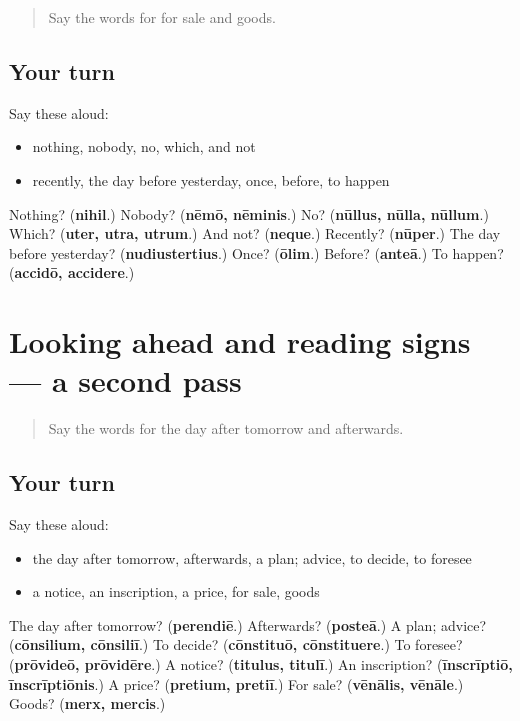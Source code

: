 \begin{quote}
Say the words for for sale and goods.
\end{quote}

\subsection*{Your turn}
Say these aloud:

\begin{itemize}
\raggedright
  \item nothing, nobody, no, which, and not
  \item recently, the day before yesterday, once, before, to happen
\end{itemize}

\begin{tcolorbox}[breakable,colback=teal!4,colframe=teal!35!black,title={Before you move on}]
Nothing? (\textbf{nihil}.) Nobody? (\textbf{nēmō, nēminis}.) No? (\textbf{nūllus, nūlla, nūllum}.) Which? (\textbf{uter, utra, utrum}.) And not? (\textbf{neque}.) Recently? (\textbf{nūper}.) The day before yesterday? (\textbf{nudiustertius}.) Once? (\textbf{ōlim}.) Before? (\textbf{anteā}.) To happen? (\textbf{accidō, accidere}.)
\end{tcolorbox}
\section[(dialogue)]{Looking ahead and reading signs — a second pass}

\label{lesson:LA-R164-second-pass-looking-ahead-and-reading-signs}



\begin{quote}
Say the words for the day after tomorrow and afterwards.
\end{quote}

\subsection*{Your turn}
Say these aloud:

\begin{itemize}
\raggedright
  \item the day after tomorrow, afterwards, a plan; advice, to decide, to foresee
  \item a notice, an inscription, a price, for sale, goods
\end{itemize}

\begin{tcolorbox}[breakable,colback=teal!4,colframe=teal!35!black,title={Before you move on}]
The day after tomorrow? (\textbf{perendiē}.) Afterwards? (\textbf{posteā}.) A plan; advice? (\textbf{cōnsilium, cōnsiliī}.) To decide? (\textbf{cōnstituō, cōnstituere}.) To foresee? (\textbf{prōvideō, prōvidēre}.) A notice? (\textbf{titulus, titulī}.) An inscription? (\textbf{īnscrīptiō, īnscrīptiōnis}.) A price? (\textbf{pretium, pretiī}.) For sale? (\textbf{vēnālis, vēnāle}.) Goods? (\textbf{merx, mercis}.)
\end{tcolorbox}
